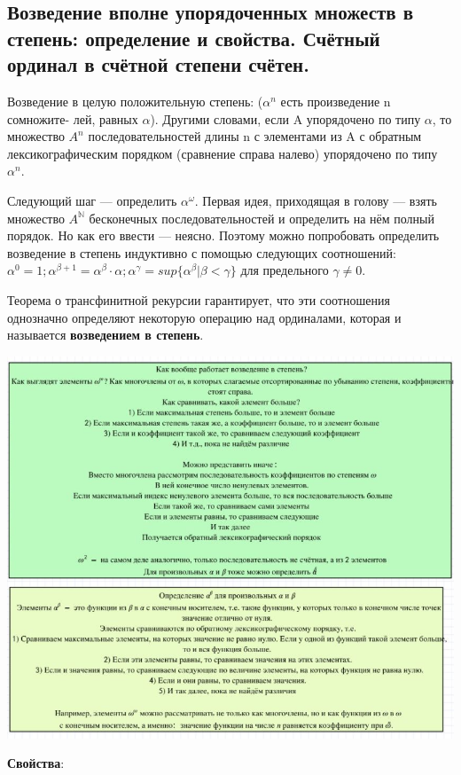 \subsection{Возведение вполне упорядоченных множеств в степень: определение и свойства. Счётный ординал в счётной степени счётен.}

Возведение в целую положительную степень: ($\alpha ^ n$ есть произведение n сомножите-
лей, равных $\alpha$). Другими словами, если A упорядочено по типу $\alpha$, то множество $A^n$ последовательностей длины n с элементами из A с обратным лексикографическим порядком (сравнение справа налево) упорядочено по типу $\alpha^n$.

Следующий шаг — определить $\alpha^{\omega}$. Первая идея, приходящая в
голову — взять множество $A^{\mathbb{N}}$ бесконечных последовательностей и
определить на нём полный порядок. Но как его ввести — неясно. Поэтому можно попробовать определить возведение в степень индуктивно с помощью следующих соотношений:
$\alpha^0 = 1; \alpha^{\beta + 1} = \alpha^{\beta} \cdot \alpha; \alpha^{\gamma} = sup\{\alpha^{\beta} | \beta < \gamma \}$ для предельного $\gamma \neq 0$.

Теорема о трансфинитной рекурсии гарантирует, что эти соотношения однозначно определяют некоторую операцию над ординалами, которая и называется \textbf{возведением в степень}.

\includegraphics[]{images/2.4_degree}

\textbf{Свойства}:

